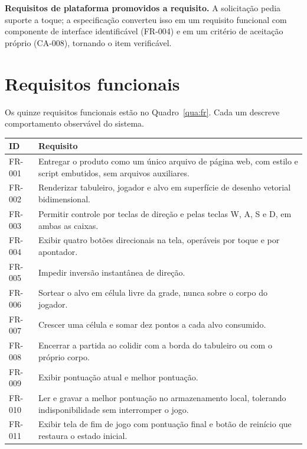 \textbf{Requisitos de plataforma promovidos a requisito.} A solicitação pedia
suporte a toque; a especificação converteu isso em um requisito funcional com
componente de interface identificável (FR-004) e em um critério de aceitação
próprio (CA-008), tornando o item verificável.

\section{Requisitos funcionais}
\label{sec:esp-fr}

Os quinze requisitos funcionais estão no Quadro~\ref{qua:fr}. Cada um descreve
comportamento observável do sistema.

\begin{quadro}[htb]
	\caption{Requisitos funcionais do sistema-alvo}
	\label{qua:fr}
	\centering
	\footnotesize
	\begin{tabularx}{\textwidth}{@{}p{1.5cm} X@{}}
		\toprule
		\textbf{ID} & \textbf{Requisito} \\
		\midrule
		FR-001 & Entregar o produto como um único arquivo de página web, com estilo e script embutidos, sem arquivos auxiliares. \\
		\addlinespace
		FR-002 & Renderizar tabuleiro, jogador e alvo em superfície de desenho vetorial bidimensional. \\
		\addlinespace
		FR-003 & Permitir controle por teclas de direção e pelas teclas W, A, S e D, em ambas as caixas. \\
		\addlinespace
		FR-004 & Exibir quatro botões direcionais na tela, operáveis por toque e por apontador. \\
		\addlinespace
		FR-005 & Impedir inversão instantânea de direção. \\
		\addlinespace
		FR-006 & Sortear o alvo em célula livre da grade, nunca sobre o corpo do jogador. \\
		\addlinespace
		FR-007 & Crescer uma célula e somar dez pontos a cada alvo consumido. \\
		\addlinespace
		FR-008 & Encerrar a partida ao colidir com a borda do tabuleiro ou com o próprio corpo. \\
		\addlinespace
		FR-009 & Exibir pontuação atual e melhor pontuação. \\
		\addlinespace
		FR-010 & Ler e gravar a melhor pontuação no armazenamento local, tolerando indisponibilidade sem interromper o jogo. \\
		\addlinespace
		FR-011 & Exibir tela de fim de jogo com pontuação final e botão de reinício que restaura o estado inicial. \\

\end{tabularx}
\end{quadro}
